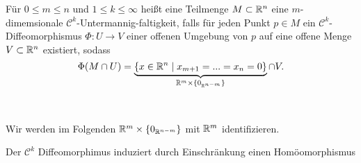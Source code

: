 \begin{definition}\begin{mdframed}
Für $0 \leq m \leq n $ und \newline $1 \leq k \leq \infty$ heißt eine Teilmenge $M\subset \mathbb{R}^n$ eine $m$-dimemsionale $\mathcal{C}^k$-Untermannig-faltigkeit, falls für jeden Punkt $p\in M$ ein $\mathcal{C}^k$-Diffeomorphismus $\Phi:U\to V$ einer offenen Umgebung von $p$ auf eine offene Menge $V\subset \mathbb{R}^n$ existiert, sodass %
\begin{equation}
\Phi(M\cap U) =\underbrace{ \{x\in \mathbb{R}^n \mid x_{m+1}=...=x_n=0\}}_{\mathbb{R}^m\times\{0_{\mathbb{R}^{n-m}}\}}\cap V.
\end{equation}
\begin{center}\ \ \ \ \ \ \ \ \ \ \ 

\end{center}
\end{mdframed}
Wir werden im Folgenden $\mathbb{R}^m\times \{0_{\mathbb{R}^{n-m}}\}$ mit $\mathbb{R}^m$ identifizieren.
\end{definition}
Der $\mathcal{C}^k$ Diffeomorphimus induziert durch Einschränkung einen Homöomorphismus

